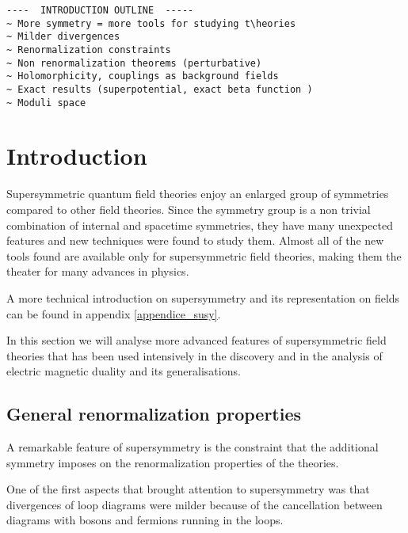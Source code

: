 


\begin{lstlisting}
----  INTRODUCTION OUTLINE  -----
~ More symmetry = more tools for studying t\heories
~ Milder divergences 
~ Renormalization constraints
~ Non renormalization theorems (perturbative)
~ Holomorphicity, couplings as background fields 
~ Exact results (superpotential, exact beta function )
~ Moduli space
\end{lstlisting}





\section{Introduction}
Supersymmetric quantum field theories enjoy an enlarged group of  symmetries compared to other field theories. 
Since the symmetry group is a non trivial combination of internal and spacetime symmetries, they have many unexpected features and new techniques were found to study them.
Almost all of the new tools found are available only for supersymmetric field theories, making them the theater for many advances in physics. 

A more technical introduction on supersymmetry and its representation on fields can be found in appendix \ref{appendice_susy}.

In this section we will analyse more advanced features of supersymmetric field theories that has been used intensively in the discovery and in the analysis of electric magnetic duality and its generalisations.














\subsection{General renormalization properties}

A remarkable feature of supersymmetry is the constraint that the additional symmetry imposes on the renormalization properties of the theories.

One of the first aspects that brought attention to supersymmetry was that divergences of loop diagrams were milder because of the cancellation between diagrams with bosons and fermions running in the loops. 

